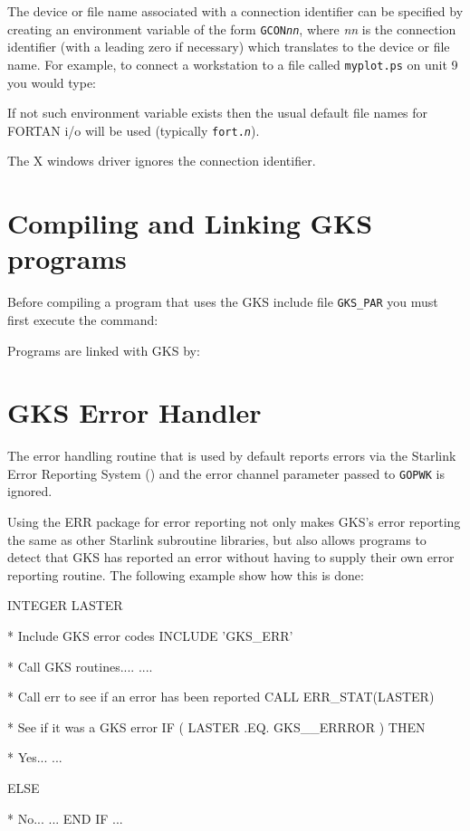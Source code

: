 \documentclass[11pt,nolof]{starlink}
\begin{document}
The device or file name associated with a connection identifier can be
specified by creating an environment variable of the form \texttt{GCON{\em{nn}}},
where \emph{nn} is the connection identifier (with a leading zero if
necessary)
which translates to the device or file name.
For example, to connect a workstation to a file called \texttt{myplot.ps}
on unit 9 you would type:
\begin{terminalv}
}\end{terminalv}
If not such environment variable exists then the usual default file names
for FORTAN i/o will be used (typically \texttt{fort.{\em{n}}}).

The X windows driver ignores the connection identifier.

\section{Compiling and Linking GKS programs}
Before compiling a program that uses the GKS include file \texttt{GKS\_PAR}
you must first execute the
command:
\begin{terminalv}
\end{terminalv}

Programs are linked with GKS by:
\begin{terminalv}
\end{terminalv}

\section{GKS Error Handler}
The error handling routine that is used by default reports errors via the
Starlink Error Reporting System () and the error
channel parameter passed to \texttt{GOPWK} is ignored.

Using the ERR package for error reporting not only makes GKS's error reporting
the same as other Starlink subroutine libraries, but also allows programs
to detect that GKS has reported an error without having to supply their
own error reporting routine. The following example show how this is
done:
\begin{terminalv}
      INTEGER LASTER

*   Include GKS error codes
      INCLUDE 'GKS_ERR'

*   Call GKS routines....
....

*   Call err to see if an error has been reported
      CALL ERR_STAT(LASTER)

*   See if it was a GKS error
      IF ( LASTER .EQ. GKS__ERRROR ) THEN

*      Yes...
...

      ELSE

*      No...
...
      END IF
...
\end{terminalv}
\end{document}
